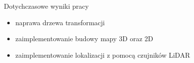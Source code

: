 \begin{frame}
{Dotychczasowe wyniki pracy}
	\begin{itemize}
		\item naprawa drzewa transformacji
		\item zaimplementowanie budowy mapy 3D oraz 2D
		\item zaimplementowanie lokalizacji z pomocą czujników LiDAR
	\end{itemize}
\end{frame}